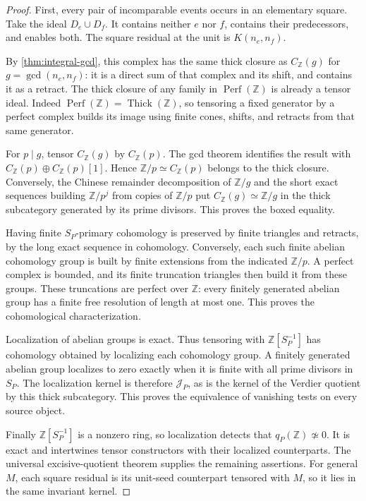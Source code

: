 \begin{proof}
First, every pair of incomparable events occurs in an elementary square. Take the ideal $D_e\cup D_f$. It contains neither $e$ nor $f$, contains their predecessors, and enables both. The square residual at the unit is $K(n_e,n_f)$.

By \cref{thm:integral-gcd}, this complex has the same thick closure as $C_{\mathbb Z}(g)$ for $g=\gcd(n_e,n_f)$: it is a direct sum of that complex and its shift, and contains it as a retract. The thick closure of any family in $\operatorname{Perf}(\mathbb Z)$ is already a tensor ideal. Indeed $\operatorname{Perf}(\mathbb Z)=\operatorname{Thick}(\mathbb Z)$, so tensoring a fixed generator by a perfect complex builds its image using finite cones, shifts, and retracts from that same generator.

For $p\mid g$, tensor $C_{\mathbb Z}(g)$ by $C_{\mathbb Z}(p)$. The gcd theorem identifies the result with $C_{\mathbb Z}(p)\oplus C_{\mathbb Z}(p)[1]$. Hence $\mathbb Z/p\simeq C_{\mathbb Z}(p)$ belongs to the thick closure. Conversely, the Chinese remainder decomposition of $\mathbb Z/g$ and the short exact sequences building $\mathbb Z/p^j$ from copies of $\mathbb Z/p$ put $C_{\mathbb Z}(g)\simeq\mathbb Z/g$ in the thick subcategory generated by its prime divisors. This proves the boxed equality.

Having finite $S_P$-primary cohomology is preserved by finite triangles and retracts, by the long exact sequence in cohomology. Conversely, each such finite abelian cohomology group is built by finite extensions from the indicated $\mathbb Z/p$. A perfect complex is bounded, and its finite truncation triangles then build it from these groups. These truncations are perfect over $\mathbb Z$: every finitely generated abelian group has a finite free resolution of length at most one. This proves the cohomological characterization.

Localization of abelian groups is exact. Thus tensoring with $\mathbb Z[S_P^{-1}]$ has cohomology obtained by localizing each cohomology group. A finitely generated abelian group localizes to zero exactly when it is finite with all prime divisors in $S_P$. The localization kernel is therefore $\mathcal J_P$, as is the kernel of the Verdier quotient by this thick subcategory. This proves the equivalence of vanishing tests on every source object.

Finally $\mathbb Z[S_P^{-1}]$ is a nonzero ring, so localization detects that $q_P(\mathbb Z)\not\simeq0$. It is exact and intertwines tensor constructors with their localized counterparts. The universal excisive-quotient theorem supplies the remaining assertions. For general $M$, each square residual is its unit-seed counterpart tensored with $M$, so it lies in the same invariant kernel.
\end{proof}

